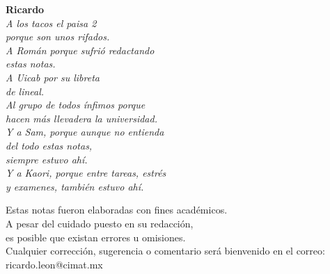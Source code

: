 \documentclass[12pt,a4paper]{book}
\begin{document}
        
    
    \thispagestyle{empty}
    

    \begin{flushright}
      \thispagestyle{empty}

        \textbf{Ricardo}\\[0.3cm]
        \textit{A los tacos el paisa 2\\
        porque son unos rifados.\\
        A Román porque sufrió redactando\\
        estas notas.\\
        A Uicab por su libreta\\
        de lineal.\\
        Al grupo de todos ínfimos porque\\
        hacen más llevadera la universidad.\\
        Y a Sam, porque aunque no entienda\\
        del todo estas notas,\\
        siempre estuvo ahí.\\
        Y a Kaori, porque entre tareas, estrés\\
        y examenes, también estuvo ahí.}\\[1.2cm]
    \end{flushright}


    \cleardoublepage
    \thispagestyle{empty}

    \begin{mdframed}[style=mdgreenbox]
        \begin{center}
        \small
        Estas notas fueron elaboradas con fines académicos.\\
        A pesar del cuidado puesto en su redacción,\\
        es posible que existan errores u omisiones.\\[0.3cm]

        Cualquier corrección, sugerencia o comentario será bienvenido
        en el correo: \\[0.3cm]

        ricardo.leon@cimat.mx
        \end{center}
    \end{mdframed}

    
\end{document}
